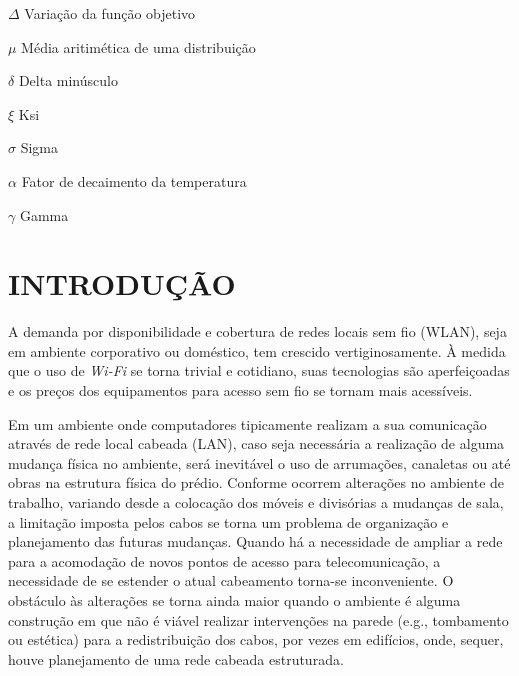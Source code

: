 \documentclass[
	12pt,				%
	twoside,			%
	a4paper,			%
	english,			%
	french,				%
	spanish,			%
	brazil				%
	]{abntex2}
\begin{document}
\begin{simbolos}
  \item[$ \Delta $] Variação da função objetivo
  \item[$ \mu $] Média aritimética de uma distribuição
  \item[$ \delta $] Delta minúsculo
  \item[$ \xi $] Ksi
  \item[$ \sigma $] Sigma
  \item[$ \alpha $] Fator de decaimento da temperatura
  \item[$ \gamma $] Gamma
\end{simbolos}
\tableofcontents*
\cleardoublepage


\textual

\chapter{INTRODUÇÃO}\label{introduuxe7uxe3o}

A demanda por disponibilidade e cobertura de redes locais sem fio
(WLAN), seja em ambiente corporativo ou doméstico, tem crescido
vertiginosamente. À medida que o uso de \emph{Wi-Fi} se torna trivial e
cotidiano, suas tecnologias são aperfeiçoadas e os preços dos
equipamentos para acesso sem fio se tornam mais
acessíveis\cite{MARQUES}.

Em um ambiente onde computadores tipicamente realizam a sua comunicação
através de rede local cabeada (LAN), caso seja necessária a realização
de alguma mudança física no ambiente, será inevitável o uso de
arrumações, canaletas ou até obras na estrutura física do prédio.
Conforme ocorrem alterações no ambiente de trabalho, variando desde a
colocação dos móveis e divisórias a mudanças de sala, a limitação
imposta pelos cabos se torna um problema de organização e planejamento
das futuras mudanças. Quando há a necessidade de ampliar a rede para a
acomodação de novos pontos de acesso para telecomunicação, a necessidade
de se estender o atual cabeamento torna-se inconveniente. O obstáculo às
alterações se torna ainda maior quando o ambiente é alguma construção em
que não é viável realizar intervenções na parede (e.g., tombamento ou
estética) para a redistribuição dos cabos, por vezes em edifícios, onde,
sequer, houve planejamento de uma rede cabeada estruturada.
\end{document}
